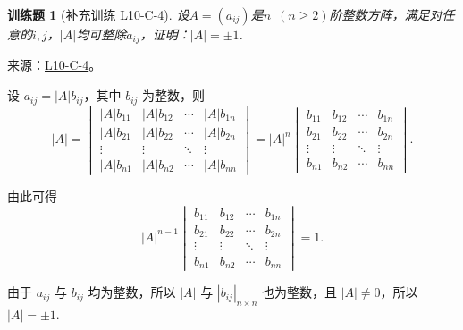 \documentclass[12pt,fontset=fandol]{ctexart}
\newtheorem{exercise}{训练题}[section]
\begin{document}
\begin{exercise}[补充训练 L10-C-4]\label{prob:L10-C-4}
设$A=(a_{ij})$是$n\enspace(n\geqslant 2)$阶整数方阵，满足对任意的$i,j$，$|A|$均可整除$a_{ij}$，证明：$|A|=\pm 1$.
\end{exercise}
\noindent 来源：\href{https://github.com/yhwu-is/Linear-Algebra-Left-Undone/blob/new/%E8%AE%B2%E4%B9%89/%E4%B8%93%E9%A2%98/10%20%E8%A1%8C%E5%88%97%E5%BC%8F.tex}{L10-C-4}。
\begin{solve}
设 $a_{ij} = |A| b_{ij}$，其中 $b_{ij}$ 为整数，则
            \[
                |A| = \begin{vmatrix}
                    |A| b_{11} & |A| b_{12} & \cdots & |A| b_{1n} \\
                    |A| b_{21} & |A| b_{22} & \cdots & |A| b_{2n} \\
                    \vdots     & \vdots     & \ddots & \vdots     \\
                    |A| b_{n1} & |A| b_{n2} & \cdots & |A| b_{nn}
                \end{vmatrix}
                = |A|^n \begin{vmatrix}
                    b_{11} & b_{12} & \cdots & b_{1n} \\
                    b_{21} & b_{22} & \cdots & b_{2n} \\
                    \vdots & \vdots & \ddots & \vdots \\
                    b_{n1} & b_{n2} & \cdots & b_{nn}
                \end{vmatrix}.
            \]

            由此可得
            \[
                |A|^{n-1} \begin{vmatrix}
                    b_{11} & b_{12} & \cdots & b_{1n} \\
                    b_{21} & b_{22} & \cdots & b_{2n} \\
                    \vdots & \vdots & \ddots & \vdots \\
                    b_{n1} & b_{n2} & \cdots & b_{nn}
                \end{vmatrix} = 1.
            \]

            由于 $a_{ij}$ 与 $b_{ij}$ 均为整数，所以 $|A|$ 与 $|b_{ij}|_{n \times n}$ 也为整数，且 $|A| \neq 0$，所以 $|A| = \pm 1$.
\end{solve}
\end{document}
